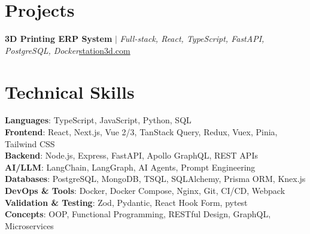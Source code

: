 \section{Projects}
\resumeSubHeadingListStart
  \resumeProjectHeading
    {\textbf{3D Printing ERP System} $|$ \emph{Full-stack, React, TypeScript, FastAPI, PostgreSQL, Docker}}{\href{https://www.station3d.com}{station3d.com}}
    \resumeItemListStart
    \resumeItemListEnd
\resumeSubHeadingListEnd

\section{Technical Skills}
 \begin{itemize}[leftmargin=0.15in, label={}]
  \small{\item{
    \textbf{Languages}{: TypeScript, JavaScript, Python, SQL} \\
    \textbf{Frontend}{: React, Next.js, Vue 2/3, TanStack Query, Redux, Vuex, Pinia, Tailwind CSS} \\
    \textbf{Backend}{: Node.js, Express, FastAPI, Apollo GraphQL, REST APIs} \\
    \textbf{AI/LLM}{: LangChain, LangGraph, AI Agents, Prompt Engineering} \\
    \textbf{Databases}{: PostgreSQL, MongoDB, TSQL, SQLAlchemy, Prisma ORM, Knex.js} \\
    \textbf{DevOps \& Tools}{: Docker, Docker Compose, Nginx, Git, CI/CD, Webpack} \\
    \textbf{Validation \& Testing}{: Zod, Pydantic, React Hook Form, pytest} \\
    \textbf{Concepts}{: OOP, Functional Programming, RESTful Design, GraphQL, Microservices} \\
  }}
 \end{itemize}


